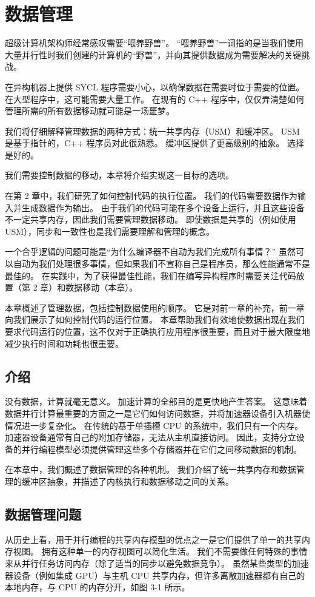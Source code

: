 \section{数据管理}
超级计算机架构师经常感叹需要“喂养野兽”。 “喂养野兽”一词指的是当我们使用大量并行性时我们创建的计算机的“野兽”，并向其提供数据成为需要解决的关键挑战。

在异构机器上提供 SYCL 程序需要小心，以确保数据在需要时位于需要的位置。 在大型程序中，这可能需要大量工作。 在现有的 C++ 程序中，仅仅弄清楚如何管理所需的所有数据移动就可能是一场噩梦。

我们将仔细解释管理数据的两种方式：统一共享内存（USM）和缓冲区。 USM 是基于指针的，C++ 程序员对此很熟悉。 缓冲区提供了更高级别的抽象。 选择是好的。

我们需要控制数据的移动，本章将介绍实现这一目标的选项。

在第 2 章中，我们研究了如何控制代码的执行位置。 我们的代码需要数据作为输入并生成数据作为输出。 由于我们的代码可能在多个设备上运行，并且这些设备不一定共享内存，因此我们需要管理数据移动。 即使数据是共享的（例如使用 USM），同步和一致性也是我们需要理解和管理的概念。

一个合乎逻辑的问题可能是“为什么编译器不自动为我们完成所有事情？” 虽然可以自动为我们处理很多事情，但如果我们不宣称自己是程序员，那么性能通常不是最佳的。 在实践中，为了获得最佳性能，我们在编写异构程序时需要关注代码放置（第 2 章）和数据移动（本章）。

本章概述了管理数据，包括控制数据使用的顺序。 它是对前一章的补充，前一章向我们展示了如何控制代码的运行位置。 本章帮助我们有效地使数据出现在我们要求代码运行的位置，这不仅对于正确执行应用程序很重要，而且对于最大限度地减少执行时间和功耗也很重要。


\subsection{介绍}
没有数据，计算就毫无意义。 加速计算的全部目的是更快地产生答案。 这意味着数据并行计算最重要的方面之一是它们如何访问数据，并将加速器设备引入机器使情况进一步复杂化。 在传统的基于单插槽 CPU 的系统中，我们只有一个内存。 加速器设备通常有自己的附加存储器，无法从主机直接访问。 因此，支持分立设备的并行编程模型必须提供管理这些多个存储器并在它们之间移动数据的机制。

在本章中，我们概述了数据管理的各种机制。 我们介绍了统一共享内存和数据管理的缓冲区抽象，并描述了内核执行和数据移动之间的关系。

\subsection{数据管理问题}
从历史上看，用于并行编程的共享内存模型的优点之一是它们提供了单一的共享内存视图。 拥有这种单一的内存视图可以简化生活。 我们不需要做任何特殊的事情来从并行任务访问内存（除了适当的同步以避免数据竞争）。 虽然某些类型的加速器设备（例如集成 GPU）与主机 CPU 共享内存，但许多离散加速器都有自己的本地内存，与 CPU 的内存分开，如图 3-1 所示。

